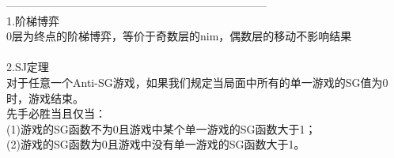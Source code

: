 ﻿-----------------------------------------------------------------------\\
1.阶梯博弈\\
0层为终点的阶梯博弈，等价于奇数层的nim，偶数层的移动不影响结果 \\
\\
2.SJ定理\\
对于任意一个Anti-SG游戏，如果我们规定当局面中所有的单一游戏的SG值为0时，游戏结束。\\
先手必胜当且仅当：\\
(1)游戏的SG函数不为0且游戏中某个单一游戏的SG函数大于1；\\
(2)游戏的SG函数为0且游戏中没有单一游戏的SG函数大于1。